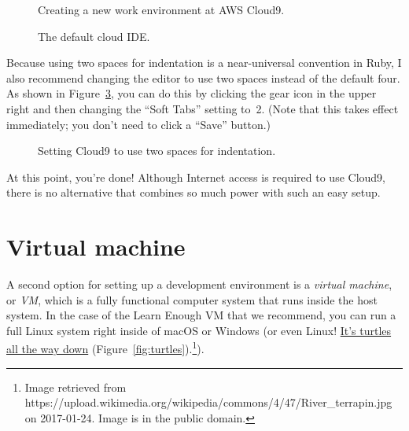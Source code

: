 \begin{figure}
\begin{center}
\end{center}
\caption{Creating a new work environment at AWS Cloud9.\label{fig:cloud9_new_workspace}}
\end{figure}

\begin{figure}
\begin{center}
\end{center}
\caption{The default cloud IDE. \label{fig:cloud9_ide_aws}}
\end{figure}

Because using two spaces for indentation is a near-universal convention in Ruby, I also recommend changing the editor to use two spaces instead of the default four. As shown in Figure~\ref{fig:cloud9_two_spaces}, you can do this by clicking the gear icon in the upper right and then changing the ``Soft Tabs'' setting to~2. (Note that this takes effect immediately; you don't need to click a ``Save'' button.)


\begin{figure}
\begin{center}
\end{center}
\caption{Setting Cloud9 to use two spaces for indentation.\label{fig:cloud9_two_spaces}}
\end{figure}

At this point, you're done! Although Internet access is required to use Cloud9, there is no alternative that combines so much power with such an easy setup.


\section{Virtual machine} %
\label{sec:virtual_machine}

A second option for setting up a development environment is a \emph{virtual machine}, or \emph{VM}, which is a fully functional computer system that runs inside the host system. In the case of the Learn Enough VM that we recommend, you can run a full Linux system right inside of macOS or Windows (or even Linux! \href{https://en.wikipedia.org/wiki/Turtles_all_the_way_down}{It's turtles all the way down} (Figure~\ref{fig:turtles}).\footnote{Image retrieved from https://upload.wikimedia.org/wikipedia/commons/4/47/River\_terrapin.jpg on 2017-01-24. Image is in the public domain.}).


